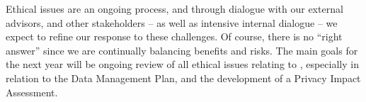 Ethical issues are an ongoing process, and through dialogue with our external advisors, and other stakeholders -- as well as intensive internal dialogue -- we expect to refine our response to these challenges.  Of course, there is no ``right answer'' since we are continually balancing benefits and risks.  The main goals for the next year will be ongoing review of all ethical issues relating to \project, especially in relation to the Data Management Plan, and the development of a Privacy Impact Assessment.


